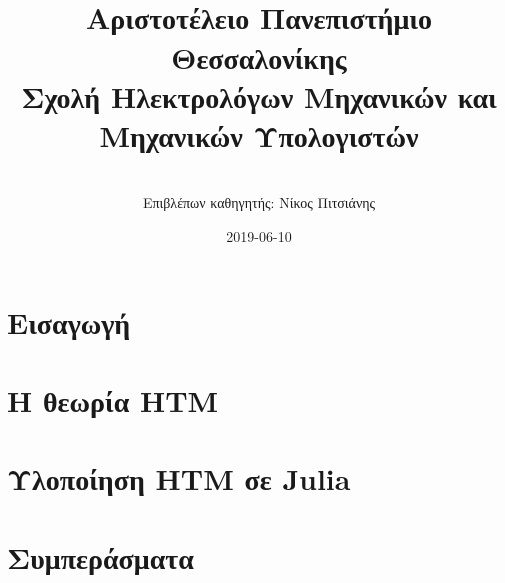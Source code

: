 \documentclass[a4paper,11pt,twoside]{report}
\title{%
\titlestring \\
{\large Αριστοτέλειο Πανεπιστήμιο Θεσσαλονίκης}\\
{\large Σχολή Ηλεκτρολόγων Μηχανικών και Μηχανικών Υπολογιστών}
}
\author{\authorstring\\ \bigskip
Επιβλέπων καθηγητής: Νίκος Πιτσιάνης}
\date{2019-06-10}
\begin{document}
\maketitle


\tableofcontents{}
\listoffigures

\chapter{Εισαγωγή}


\chapter{Η θεωρία HTM}


\chapter{Υλοποίηση HTM σε Julia} \label{impl}




\chapter{Συμπεράσματα}


\printbibliography

%
\end{document}
